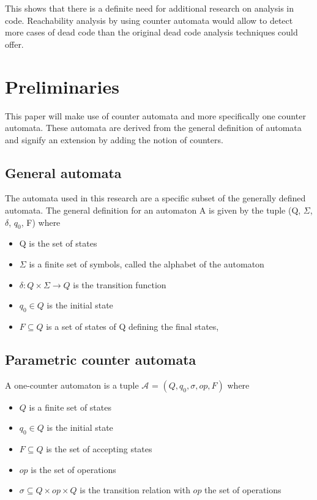 \documentclass[12pt]{article}
\begin{document}
This shows that there is a definite need for additional research on analysis in code. Reachability analysis by using counter automata would allow to detect more cases of dead code than the original dead code analysis techniques could offer. 

\section{Preliminaries}
This paper will make use of counter automata and more specifically one counter automata. These automata are derived from the general definition of automata and signify an extension by adding the notion of counters.

\subsection{General automata}
The automata used in this research are a specific subset of the generally defined automata. The general definition for an automaton A is given by the tuple (Q, $\Sigma$, $\delta$, $q_0$, F) where
\begin{itemize}
	\item Q is the set of states
	\item $\Sigma$ is a finite set of symbols, called the alphabet of the automaton
	\item $\delta: Q \times \Sigma \rightarrow Q$ is the transition function
	\item $q_0 \in Q$ is the initial state
	\item $F \subseteq Q$ is a set of states of Q defining the final states, 
\end{itemize}

\subsection{Parametric counter automata}

A one-counter automaton is a tuple $\mathcal{A}$ = $(Q, q_0, \sigma, op, F)$ where
\begin{itemize}
	\item $Q$ is a finite set of states
	\item $q_0 \in Q$ is the initial state
	\item $F \subseteq Q$ is the set of accepting states
	\item $op$ is the set of operations
	\item $\sigma \subseteq Q \times op \times Q$ is the transition relation with $op$ the set of operations
\end{itemize}
\end{document}
